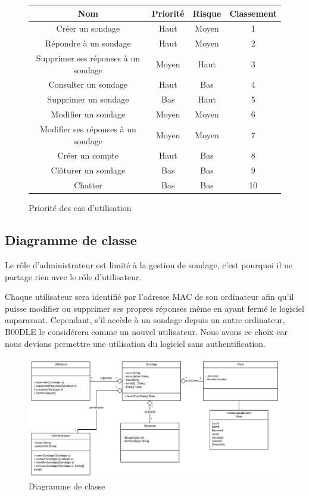 \documentclass[titlepage]{report}
\begin{document}
	\begin{figure}[h]
	\caption{Priorité des cas d'utilisation}
	\label{tableau_casDUtilisation}
	\centering
\begin{tabular}{|c|c|c|c|}
	\hline
	Nom & Priorité & Risque & Classement \\
	\hline
	Créer un sondage & Haut & Moyen & 1 \\
	Répondre à un sondage & Haut & Moyen & 2 \\
	Supprimer ses réponses à un sondage & Moyen & Haut & 3 \\
	Consulter un sondage & Haut & Bas & 4 \\
	Supprimer un sondage & Bas & Haut & 5 \\
	Modifier un sondage & Moyen & Moyen & 6 \\
	Modifier ses réponses à un sondage & Moyen & Moyen & 7 \\
	Créer un compte & Haut & Bas & 8 \\
	Clôturer un sondage & Bas & Bas & 9 \\
	Chatter & Bas & Bas & 10 \\
	\hline
\end{tabular}
\end{figure}

\subsection{Diagramme de classe}

\par Le rôle d'administrateur est limité à la gestion de sondage, c'est pourquoi il ne partage rien avec le rôle d'utilisateur. 
\par Chaque utilisateur sera identifié par l'adresse MAC de son ordinateur afin qu'il puisse modifier ou supprimer ses propres réponses même en ayant fermé le logiciel auparavant. 
Cependant, s'il accède à un sondage depuis un autre ordinateur, B00DLE le considérera comme un nouvel utilisateur. Nous avons ce choix car nous devions permettre une utilisation du logiciel sans authentification.

\begin{figure}[h]
	\caption{Diagramme de classe}
	\label{diagramme_classes}
	\centering
	\includegraphics[width=\textwidth]{figures/diagrammes/classes.png}
\end{figure}
\end{document}
